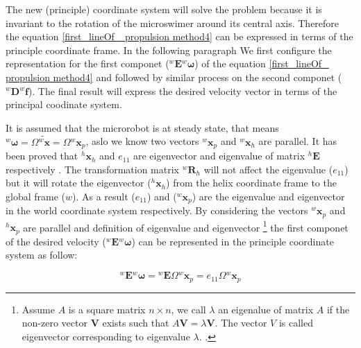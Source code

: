 \documentclass[12pt,a4paper,titlepage]{report}
\begin{document}
The new (principle) coordinate system will solve the problem because it is invariant to the rotation
 of the microswimer around its central axis. Therefore the equation \ref{first_lineOf_ propulsion method4} can
be expressed in terms of the principle coordinate frame. In the following paragraph
We first configure the representation for the first componet (${^{w}\bm{E}} {^{w}\bm{\omega}}$) of the 
equation \ref{first_lineOf_ propulsion method4} 
 and followed by similar process on the second componet (${^{w}\bm{D}} {^{w}\bm{f}}$). The final result will express the 
desired velocity vector in terms of the principal coodinate system. 


It is assumed that the microrobot is at steady state, that means $^{w}\bm{\omega} = 
\Omega \tilde{^{w}{\bm{x}}} = \Omega {^{w}{\bm{x}_p}}$, aslo we know two vectors ${^{w}{\bm{x}_p}}$ and
 ${^{w}{\bm{x}_h}}$ are parallel. It has been proved that $^{h}\bm{x}_h$ and $e_{11}$ are eigenvector and eigenvalue
of matrix $^{h}\bm{E}$ respectively \citep{mahoney2011velocity}. The transformation matrix $^{w}\bm{R}_h$ 
will not affect the eigenvalue ($e_{11}$) but it will rotate the eigenvector ($^{h}\bm{x}_h$) from the helix coordinate
frame to the global frame ($w$). As a result ($e_{11}$) and ($^{w}\bm{x}_p$) are the eigenvalue and eigenvector
in the world coordinate system respectively. By considering the vectors $^{w}\bm{x}_p$ and $^{h}\bm{x}_p$ are parallel 
and definition of eigenvalue and eigenvector \footnote{Assume $A $ is a square matrix $n \times n$, we call
$\lambda$ an eigenalue of matrix $A$ if the non-zero vector $\bm{V}$ exists such that $A\bm{V} = \lambda \bm{V}$.
The vector $V$ is called eigenvector corresponding to eigenvalue $\lambda$.
 \citep{Doe:2013Nov:Online}.}
the first componet of the desired velocity (${^{w}\bm{E}} {^{w}\bm{\omega}}$) can be 
represented in the principle
coordinate system as follow:


\begin{equation}
{^{w}\bm{E}} {^{w}\bm{\omega}} = {^{w}\bm{E}} \Omega {^{w}{\bm{x}_p}} = e_{11} \Omega {^{w}{\bm{x}_p}}
\label{E_W}
\end{equation}
\end{document}

